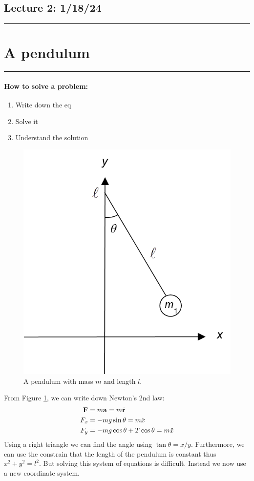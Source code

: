 \documentclass[../main.tex]{subfiles}
\begin{document}
\newpage
\subsection*{Lecture 2: \hfill  1/18/24}
\hrule \vspace{10px}
\section{A pendulum}
\hrule \vspace{10px}

\paragraph{How to solve a problem:}
\begin{enumerate}
    \item Write down the eq
    \item Solve it
    \item Understand the solution
\end{enumerate}

\begin{figure}[ht]
    \centering
    \includegraphics[width=0.4\linewidth]{pendulum.png}
    \caption{A pendulum with mass $m$ and length $l$.}
    \label{fig:2.1}
\end{figure}    
From Figure \ref{fig:2.1}, we can write down Newton's 2nd law:
\begin{align*}
    \vb{F} &= m\vb{a} = m \ddot{\vb{r}} \\
    F_x &= -mg \sin \theta = m \ddot x \\
    F_y &= -mg \cos \theta + T \cos\theta = m \ddot x
\end{align*}
Using a right triangle we can find the angle using $\tan\theta = x/y$. Furthermore, we can use the
constrain that the length of the pendulum is constant thus $x^2 + y^2 = l^2$. But solving this
system of equations is difficult. Instead we now use a new coordinate system.
\end{document}
